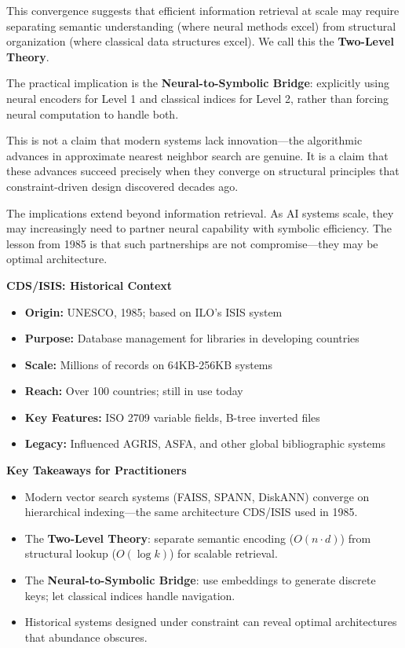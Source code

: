 \documentclass[manuscript,screen,nonacm]{acmart}
\newenvironment{sidebarbox}[1][]{%
  \def\sidebarboxtitle{#1}%
  \begin{oframed}%
  \noindent\textbf{\sidebarboxtitle}\par\smallskip
}{%
  \end{oframed}%
}
\begin{document}
This convergence suggests that efficient information retrieval at scale may require separating semantic understanding (where neural methods excel) from structural organization (where classical data structures excel). We call this the \textbf{Two-Level Theory}.

The practical implication is the \textbf{Neural-to-Symbolic Bridge}: explicitly using neural encoders for Level 1 and classical indices for Level 2, rather than forcing neural computation to handle both.

This is not a claim that modern systems lack innovation---the algorithmic advances in approximate nearest neighbor search are genuine. It is a claim that these advances succeed precisely when they converge on structural principles that constraint-driven design discovered decades ago.

The implications extend beyond information retrieval. As AI systems scale, they may increasingly need to partner neural capability with symbolic efficiency. The lesson from 1985 is that such partnerships are not compromise---they may be optimal architecture.

\begin{sidebarbox}[CDS/ISIS: Historical Context]
\begin{itemize}
    \item \textbf{Origin:} UNESCO, 1985; based on ILO's ISIS system
    \item \textbf{Purpose:} Database management for libraries in developing countries
    \item \textbf{Scale:} Millions of records on 64KB-256KB systems
    \item \textbf{Reach:} Over 100 countries; still in use today
    \item \textbf{Key Features:} ISO 2709 variable fields, B-tree inverted files
    \item \textbf{Legacy:} Influenced AGRIS, ASFA, and other global bibliographic systems
\end{itemize}
\end{sidebarbox}

\begin{sidebarbox}[Key Takeaways for Practitioners]
\begin{itemize}
    \item Modern vector search systems (FAISS, SPANN, DiskANN) converge on hierarchical indexing---the same architecture CDS/ISIS used in 1985.
    \item The \textbf{Two-Level Theory}: separate semantic encoding ($O(n \cdot d)$) from structural lookup ($O(\log k)$) for scalable retrieval.
    \item The \textbf{Neural-to-Symbolic Bridge}: use embeddings to generate discrete keys; let classical indices handle navigation.
    \item Historical systems designed under constraint can reveal optimal architectures that abundance obscures.
\end{itemize}
\end{sidebarbox}
\end{document}
